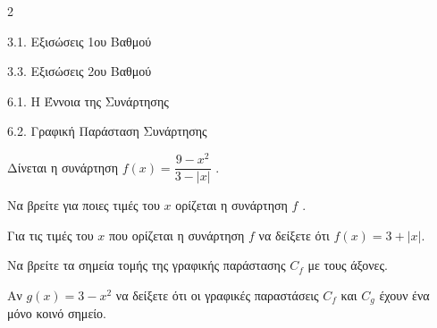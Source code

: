 \begin{ylh}{2}
    \item 3.1. Εξισώσεις 1ου Βαθμού
    \item 3.3. Εξισώσεις 2ου Βαθμού
    \item 6.1. Η Έννοια της Συνάρτησης
    \item 6.2. Γραφική Παράσταση Συνάρτησης
\end{ylh}
Δίνεται η συνάρτηση $f(x) = \dfrac{9 - x^{2}}{3 - |x|}$ .

\begin{alist}
\item Να βρείτε για ποιες τιμές του $x$ ορίζεται η συνάρτηση $f$ .
\item Για τις τιμές του $x$ που ορίζεται η συνάρτηση $f$ να δείξετε ότι $f(x) = 3 + |x|$.
\item Να βρείτε τα σημεία τομής της γραφικής παράστασης $C_{f}$ με τους άξονες.
\item Αν $g(x) = 3 - x^{2}$ να δείξετε ότι οι γραφικές παραστάσεις $C_{f}$ και $C_{g}$ έχουν ένα μόνο κοινό σημείο.
\end{alist}

